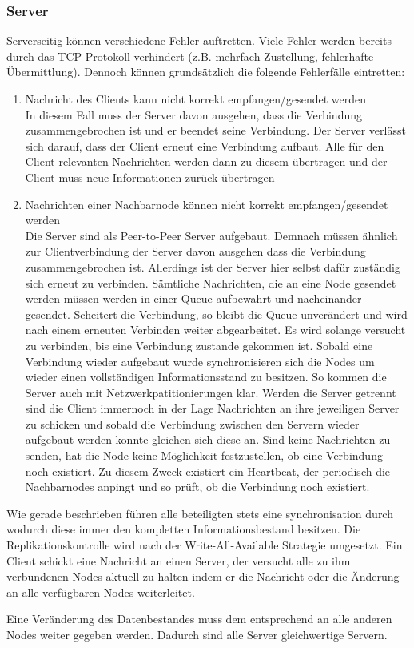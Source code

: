 \subsubsection{Server}
Serverseitig können verschiedene Fehler auftretten. Viele Fehler werden bereits durch das TCP-Protokoll verhindert (z.B. mehrfach Zustellung, fehlerhafte Übermittlung).
Dennoch können grundsätzlich die folgende Fehlerfälle eintretten:
\begin{enumerate}
    \item Nachricht des Clients kann nicht korrekt empfangen/gesendet werden\\
        In diesem Fall muss der Server davon ausgehen, dass die Verbindung zusammengebrochen ist und er beendet
        seine Verbindung. Der Server verlässt sich darauf, dass der Client erneut eine Verbindung aufbaut.
        Alle für den Client relevanten Nachrichten werden dann zu diesem übertragen und der Client muss
        neue Informationen zurück übertragen
    \item Nachrichten einer Nachbarnode können nicht korrekt empfangen/gesendet werden\\
        Die Server sind als Peer-to-Peer Server aufgebaut. Demnach müssen ähnlich zur Clientverbindung der Server davon ausgehen dass die Verbindung zusammengebrochen ist.
        Allerdings ist der Server hier selbst dafür zuständig sich erneut zu verbinden. Sämtliche Nachrichten,
        die an eine Node gesendet werden müssen werden in einer Queue aufbewahrt und nacheinander gesendet.
        Scheitert die Verbindung, so bleibt die Queue unverändert und wird nach einem erneuten Verbinden
        weiter abgearbeitet. Es wird solange versucht zu verbinden, bis eine Verbindung zustande gekommen ist.
        Sobald eine Verbindung wieder aufgebaut wurde synchronisieren sich die Nodes um wieder einen vollständigen Informationsstand zu besitzen. So kommen die Server auch mit Netzwerkpatitionierungen klar. Werden die Server getrennt sind die Client immernoch in der Lage Nachrichten an ihre jeweiligen Server zu schicken und sobald die Verbindung zwischen den Servern wieder aufgebaut werden konnte gleichen sich diese an.
        Sind keine Nachrichten zu senden, hat die Node keine Möglichkeit festzustellen,
        ob eine Verbindung noch existiert. Zu diesem Zweck existiert ein Heartbeat, der periodisch
        die Nachbarnodes anpingt und so prüft, ob die Verbindung noch existiert.
\end{enumerate}
Wie gerade beschrieben führen alle beteiligten stets eine synchronisation durch wodurch diese immer den kompletten Informationsbestand besitzen. Die Replikationskontrolle wird nach der Write-All-Available Strategie umgesetzt. Ein Client schickt eine Nachricht an einen Server, der versucht alle zu ihm verbundenen Nodes aktuell zu halten indem er die Nachricht oder die Änderung an alle verfügbaren Nodes weiterleitet.

Eine Veränderung des Datenbestandes muss dem entsprechend an alle anderen Nodes weiter gegeben werden.
Dadurch sind alle Server gleichwertige Servern.




